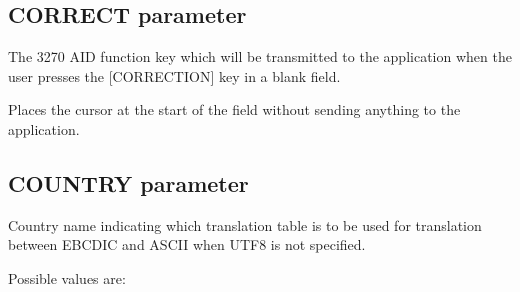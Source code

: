 \documentclass[letterpaper,10pt,english]{sphinxmanual}
\begin{document}
\ignorespaces 

\subsection{CORRECT parameter}
\label{\detokenize{Installation_Guide:correct-parameter}}\label{\detokenize{Installation_Guide:index-47}}
\begin{sphinxVerbatim}[commandchars=\\\{\}]
  
\end{sphinxVerbatim}

\sphinxAtStartPar
{} \sphinxhyphen{} The 3270 AID function key which will be transmitted to the application when the user presses the {[}CORRECTION{]} key in a blank field.

\sphinxAtStartPar
{} \sphinxhyphen{} Places the cursor at the start of the field without sending anything to the application.

\ignorespaces 

\subsection{COUNTRY parameter}
\label{\detokenize{Installation_Guide:country-parameter}}\label{\detokenize{Installation_Guide:index-48}}
\begin{sphinxVerbatim}[commandchars=\\\{\}]
 
\end{sphinxVerbatim}

\sphinxAtStartPar
{} \sphinxhyphen{} Country name indicating which translation table is to be used for translation between EBCDIC and ASCII when UTF\sphinxhyphen{}8 is not specified.

\sphinxAtStartPar
Possible values are:
\end{document}

